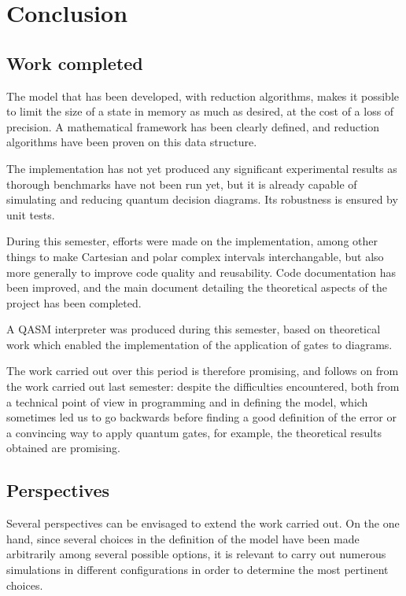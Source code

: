 
\chapter{Conclusion} %
\label{ch:Conclusion}

\section{Work completed}

The model that has been developed, with reduction algorithms, makes it possible to limit the size of a state in memory as much as desired, at the cost of a loss of precision. A mathematical framework has been clearly defined, and reduction algorithms have been proven on this data structure.

The implementation has not yet produced any significant experimental results as thorough benchmarks have not been run yet, but it is already capable of simulating and reducing quantum decision diagrams. Its robustness is ensured by unit tests.

During this semester, efforts were made on the implementation, among other things to make Cartesian and polar complex intervals interchangable, but also more generally to improve code quality and reusability. Code documentation has been improved, and the main document detailing the theoretical aspects of the project has been completed.

A QASM interpreter was produced during this semester, based on theoretical work which enabled the implementation of the application of gates to diagrams.

The work carried out over this period is therefore promising, and follows on from the work carried out last semester: despite the difficulties encountered, both from a technical point of view in programming and in defining the model, which sometimes led us to go backwards before finding a good definition of the error or a convincing way to apply quantum gates, for example, the theoretical results obtained are promising.

\section{Perspectives}

Several perspectives can be envisaged to extend the work carried out. On the one hand, since several choices in the definition of the model have been made arbitrarily among several possible options, it is relevant to carry out numerous simulations in different configurations in order to determine the most pertinent choices.

